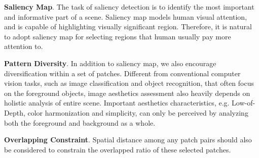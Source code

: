 \documentclass[10pt,twocolumn,letterpaper]{article}
\begin{document}
\textbf{Saliency Map}. The task of saliency detection is to identify the most important and informative part of a scene. Saliency map models human visual attention, and is capable of highlighting visually significant region. Therefore, it is natural to adopt saliency map for selecting regions that human usually pay more attention to.

\textbf{Pattern Diversity}. In addition to saliency map, we also encourage diversification within a set of patches. Different from conventional computer vision tasks, such as image classification and object recognition, that often focus on the foreground objects, image aesthetics assessment also heavily depends on holistic analysis of entire scene. Important aesthetics characteristics, e.g. Low-of-Depth, color harmonization and simplicity, can only be perceived by analyzing both the foreground and background as a whole. 

\textbf{Overlapping Constraint}. Spatial distance among any patch pairs should also be considered to constrain the overlapped ratio of these selected patches. 
\end{document}
